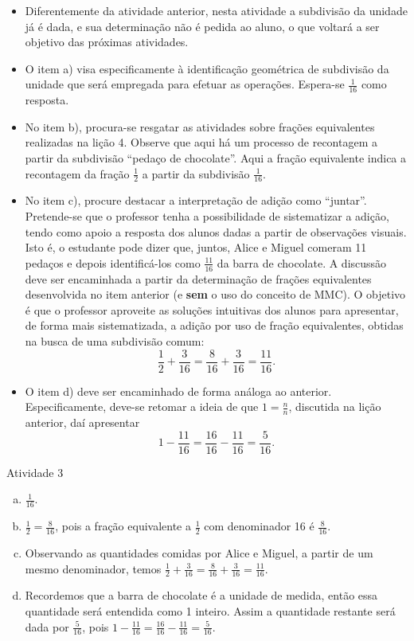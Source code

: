 \begin{multicols}{2}
\begin{itemize} %
  \item      Diferentemente da atividade anterior, nesta atividade a subdivisão da unidade já é dada, e sua determinação não é pedida ao aluno, o que voltará a ser objetivo das próximas atividades.
  \item      O item a) visa especificamente à identificação geométrica de subdivisão da unidade que será empregada para efetuar as operações. Espera-se     $\frac{1}{16}$     como resposta.
  \item     No item b), procura-se resgatar as atividades sobre frações equivalentes realizadas na lição 4. Observe que aqui há um processo de recontagem a partir da subdivisão ``pedaço de chocolate''. Aqui a fração equivalente indica a recontagem da fração $\frac{1}{2}$ a partir da subdivisão $\frac{1}{16}$.
  \item  No item c), procure destacar a interpretação de adição como ``juntar''. Pretende-se que o professor tenha a possibilidade de sistematizar a adição, tendo como apoio a resposta dos alunos dadas a partir de observações visuais. Isto é, o estudante pode dizer que, juntos, Alice e Miguel comeram 11 pedaços e depois identificá-los como $\frac{11}{16}$ da barra de chocolate. A discussão deve ser encaminhada a partir da determinação de frações equivalentes desenvolvida no item anterior (e {\bf sem} o uso do conceito de MMC). O objetivo é que o professor aproveite as soluções intuitivas dos alunos para apresentar, de forma mais sistematizada, a adição por uso de fração equivalentes, obtidas na busca de uma subdivisão comum:
$$\frac{1}{2} + \frac{3}{16} = \frac{8}{16} + \frac{3}{16} = \frac{11}{16}.$$
  \item  O item d) deve ser encaminhado de forma análoga ao anterior. Especificamente, deve-se retomar a ideia de que $1 = \frac{n}{n}$, discutida na lição anterior, daí apresentar $$1 - \frac{11}{16} =  \frac{16}{16} - \frac{11}{16} = \frac{5}{16}.$$
\end{itemize} %

  \begin{resposta*}{Atividade 3}
    \begin{enumerate}[a)]
     \item $\frac{1}{16}$.
     \item $\frac{1}{2}=\frac{8}{16}$, pois a fração equivalente a $\frac{1}{2}$ com denominador 16 é $\frac{8}{16}$.
     \item Observando as quantidades comidas por Alice e Miguel, a partir de um mesmo denominador, temos $\frac{1}{2}+\frac{3}{16} = \frac{8}{16} + \frac{3}{16} = \frac{11}{16}$.
     \item Recordemos que a barra de chocolate é a unidade de medida, então essa quantidade será entendida como 1 inteiro. Assim a quantidade restante será dada por $\frac{5}{16}$, pois $1 - \frac{11}{16} = \frac{16}{16} - \frac{11}{16} = \frac{5}{16}$.
    \end{enumerate}
  \end{resposta*}


\end{multicols}
